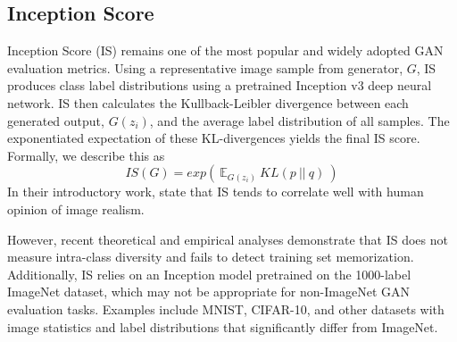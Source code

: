 \subsection{Inception Score}
\label{sub:inception_score}

Inception Score (IS) \cite{gulrajani2017improved} remains one of the most popular and widely adopted GAN evaluation metrics.
Using a representative image sample from generator, $G$, IS produces class label distributions using a pretrained Inception v3 deep neural network.
IS then calculates the Kullback-Leibler divergence between each generated output, $G(z_i)$, and the average label distribution of all samples.
The exponentiated expectation of these KL-divergences yields the final IS score.
Formally, we describe this as 
\begin{equation}
	IS(G) = exp(\ \mathbb{E}_{G(z_i)}\ KL(p\ ||\ q)\ )
\end{equation}
In their introductory work, \cite{salimans2016improved} state that IS tends to correlate well with human opinion of image realism.

However, recent theoretical and empirical analyses \cite{barratt2018note, borji2018pros, odena2016conditional} demonstrate that IS does not measure intra-class diversity and fails to detect training set memorization.
Additionally, IS relies on an Inception model pretrained on the 1000-label ImageNet dataset, which may not be appropriate for non-ImageNet GAN evaluation tasks. 
Examples include MNIST, CIFAR-10, and other datasets with image statistics and label distributions that significantly differ from ImageNet.